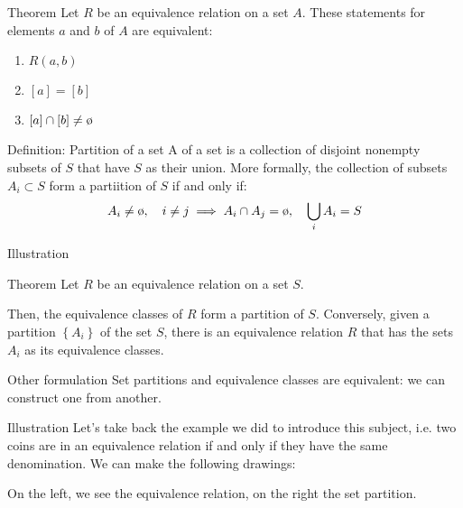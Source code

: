 \documentclass[a4paper]{article}
\begin{document}
\begin{parag}{Theorem}
    Let $R$ be an equivalence relation on a set $A$. These statements for elements $a$ and $b$ of $A$ are equivalent:
    \begin{enumerate}
        \item $R\left(a, b\right)$
        \item $\left[a\right] = \left[b\right]$
        \item $\left[a\right] \cap \left[b\right] \neq \o$
    \end{enumerate}

\end{parag}

\begin{parag}{Definition: Partition of a set}
    A  of a set is a collection of disjoint nonempty subsets of $S$ that have $S$ as their union. More formally, the collection of subsets $A_i \subset S$ form a partiition of $S$ if and only if:
    \[A_i \neq \o, \mathspace i \neq j \implies A_i \cap A_j = \o, \mathspace \bigcup_{i} A_i = S\]

    \begin{subparag}{Illustration}
    \end{subparag}
\end{parag}

\begin{parag}{Theorem}
    Let $R$ be an equivalence relation on a set $S$.

    Then, the equivalence classes of $R$ form a partition of $S$. Conversely, given a partition $\left\{A_i\right\}$ of the set $S$, there is an equivalence relation $R$ that has the sets $A_i$ as its equivalence classes.

    \begin{subparag}{Other formulation}
        Set partitions and equivalence classes are equivalent: we can construct one from another.
    \end{subparag}

    \begin{subparag}{Illustration}
        Let's take back the example we did to introduce this subject, i.e. two coins are in an equivalence relation if and only if they have the same denomination. We can make the following drawings:

        On the left, we see the equivalence relation, on the right the set partition.
    \end{subparag}
\end{parag}
\end{document}
